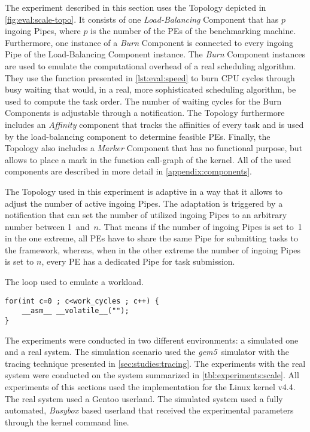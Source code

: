 The experiment described in this section uses the Topology depicted in \cref{fig:eval:scale-topo}. It consists of one \emph{Load-Balancing} Component that has \(p\) ingoing Pipes, where \(p\) is the number of the \acp{PE} of the benchmarking machine. Furthermore, one instance of a \emph{Burn} Component is connected to every ingoing Pipe of the Load-Balancing Component instance. The \emph{Burn} Component instances are used to emulate the computational overhead of a real scheduling algorithm. They use the function presented in \cref{lst:eval:speed} to burn CPU cycles through busy waiting that would, in a real, more sophisticated scheduling algorithm, be used to compute the task order. The number of waiting cycles for the Burn Components is adjustable through a notification. The Topology furthermore includes an \emph{Affinity} component that tracks the affinities of every task and is used by the load-balancing component to determine feasible \acp{PE}. Finally, the Topology also includes a \emph{Marker} Component that has no functional purpose, but allows to place a mark in the function call-graph of the kernel. All of the used components are described in more detail in \cref{appendix:components}.

The Topology used in this experiment is adaptive in a way that it allows to adjust the number of active ingoing Pipes. The adaptation is triggered by a notification that can set the number of utilized ingoing Pipes to an arbitrary number between 1~and~\(n\). That means if the number of ingoing Pipes is set to~1 in the one extreme, all \acp{PE} have to share the same Pipe for submitting tasks to the \cobas{} framework, whereas, when in the other extreme the number of ingoing Pipes is set to \(n\), every \ac{PE} has a dedicated Pipe for task submission.

\begin{center}
	\begin{listing}[!t]
		\begin{minipage}{.66\textwidth}
			\captionsetup{margin=0pt}
			\caption{The loop used to emulate a workload.}
			\label{lst:eval:speed}
\begin{verbatim}
for(int c=0 ; c<work_cycles ; c++) {
    __asm__ __volatile__("");
}
\end{verbatim}
		\end{minipage}
	\end{listing}
\end{center}

The experiments were conducted in two different environments: a simulated one and a real system. The simulation scenario used the \emph{gem5}~simulator with the tracing technique presented in \cref{sec:studies:tracing}. The experiments with the real system were conducted on the system summarized in \cref{tbl:experiments:scale}. All experiments of this sections used the \cobas{} implementation for the Linux kernel v4.4. The real system used a Gentoo userland. The simulated system used a fully automated, \emph{Busybox} based userland that received the experimental parameters through the kernel command line.

